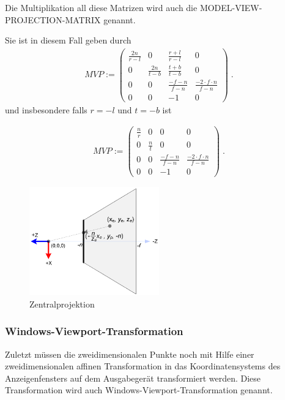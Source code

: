 Die Multiplikation all diese Matrizen wird auch die MODEL-VIEW-PROJECTION-MATRIX genannt. 

Sie ist in diesem Fall geben durch 
\begin{align*}
MVP := \begin{pmatrix}  
\frac{2n}{r-l}  &  0 &  \frac{r+l}{r-l}  & 0  \\
0   &  \frac{2n}{t-b} & \frac{t+b}{t-b} & 0  \\
0   &  0 & \frac{-f-n}{f-n} & \frac{-2\cdot f \cdot n}{f-n}  \\
0   &  0 & -1 & 0  
\end{pmatrix}  \; .
\end{align*} 
und insbesondere falls $r = -l$ und $t=-b$  ist

\begin{align*}
MVP := \begin{pmatrix}  
\frac{n}{r}  &  0 & 0  & 0  \\
0   &  \frac{n}{t} & 0 & 0  \\
0   &  0 & \frac{-f-n}{f-n} & \frac{-2\cdot f \cdot n}{f-n}  \\
0   &  0 & -1 & 0  
\end{pmatrix}  \; .
\end{align*} 

\begin{figure}[H]
    \centering
    \includegraphics[width=0.5\textwidth]{images/gl_projectionmatrix03.png}
    \caption{Zentralprojektion}
    \label{fig:projection-sight-vol}
\end{figure}

\subsubsection*{Windows-Viewport-Transformation}
Zuletzt müssen die zweidimensionalen Punkte noch mit Hilfe einer 
zweidimensionalen affinen Transformation in das Koordinatensystems des 
Anzeigenfensters auf dem Ausgabegerät transformiert werden. 
Diese Transformation wird auch Windows-Viewport-Transformation genannt.

